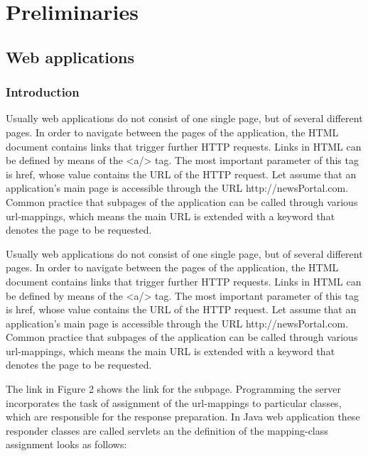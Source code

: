 \chapter{Preliminaries}

\section{Web applications}

\subsection{Introduction}

Usually web applications do not consist of one single page, but of several different pages. In order to navigate between the pages of the application, the HTML document contains links that trigger further HTTP requests. Links in HTML can be defined by means of the <a/> tag.  The most important parameter of this tag is href, whose value contains the URL of the HTTP request. 
Let assume that an application’s main page is accessible through the URL http://newsPortal.com. Common practice that subpages of the application can be called through various url-mappings, which means the main URL is extended with a keyword that denotes the page to be requested. 


Usually web applications do not consist of one single page, but of several different pages. In order to navigate between the pages of the application, the HTML document contains links that trigger further HTTP requests. Links in HTML can be defined by means of the <a/> tag.  The most important parameter of this tag is href, whose value contains the URL of the HTTP request. 
Let assume that an application’s main page is accessible through the URL http://newsPortal.com. Common practice that subpages of the application can be called through various url-mappings, which means the main URL is extended with a keyword that denotes the page to be requested. 


The link in Figure 2 shows the link for the subpage. Programming the server incorporates the task of assignment of the url-mappings to particular classes, which are responsible for the response preparation. In Java web application these responder classes are called servlets an the definition of the mapping-class assignment looks as follows:

